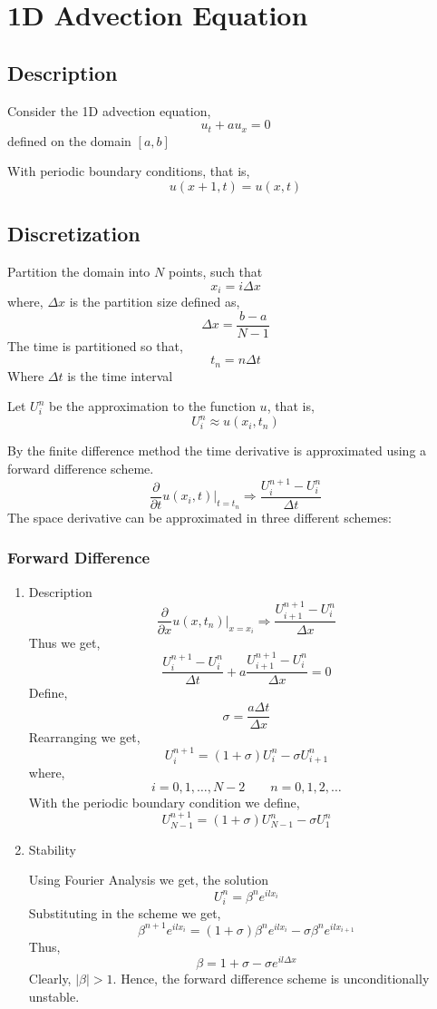 \documentclass[11pt]{article}
\date{\today}
\title{}
\begin{document}
\tableofcontents

\section{1D Advection Equation}
\label{sec:orgfada84c}
\subsection{Description}
\label{sec:orgc50bc7d}
Consider the 1D advection equation,
$$u_t + a u_x = 0$$
defined on the domain \([a,b]\)

With periodic boundary conditions, that is,
$$u(x+1,t) = u(x,t)$$
\subsection{Discretization}
\label{sec:orge79bf49}
Partition the domain into \(N\) points, such that
$$x_i = i \Delta x$$
where, \(\Delta x\) is the partition size defined as,
$$\Delta x = \frac{b - a}{N-1}$$
The time is partitioned so that,
$$t_n = n \Delta t$$
Where \(\Delta t\) is the time interval

Let \(U_i^n\) be the approximation to the function \(u\), that is,
$$U_i^n \approx u(x_i,t_n)$$

By the finite difference method the time derivative is approximated using a forward difference scheme.
$$\frac{\partial}{\partial t} u(x_i,t) \bigg|_{t=t_n} \Rightarrow \frac{U_i^{n+1} - U_i^n}{\Delta t}$$
The space derivative can be approximated in three different schemes:
\subsubsection{Forward Difference}
\label{sec:org03cc0ae}
\begin{enumerate}
\item Description
\label{sec:org9fb14fc}
$$\frac{\partial}{\partial x} u(x,t_n) \bigg|_{x=x_i} \Rightarrow \frac{U_{i+1}^{n+1} - U_i^n}{\Delta x}$$
Thus we get,
$$\frac{U_i^{n+1} - U_i^n}{\Delta t} + a \frac{U_{i+1}^{n+1} - U_i^n}{\Delta x} = 0$$
Define,
$$\sigma = \frac{a \Delta t}{\Delta x}$$
Rearranging we get,
$$U_i^{n+1} = \left( 1 + \sigma \right) U_i^n - \sigma U_{i+1}^n$$
where,
$$i=0,1,\ldots,N-2 \qquad n = 0,1,2,\ldots$$
With the periodic boundary condition we define,
$$U_{N-1}^{n+1} = \left( 1 + \sigma \right) U_{N-1}^n - \sigma U_{1}^n$$
\item Stability
\label{sec:org364e93e}

Using Fourier Analysis we get, the solution
$$U_i^n = \beta^n e^{i l x_i}$$
Substituting in the scheme we get,
$$\beta^{n+1} e^{i l x_i} = \left( 1 + \sigma \right) \beta^n e^{i l x_i} - \sigma \beta^n e^{i l x_{i+1}}$$
Thus,
$$\beta = 1 + \sigma - \sigma e^{i l \Delta x}$$
Clearly, \(\lvert \beta \rvert > 1\). Hence, the forward difference scheme is unconditionally unstable.
\end{enumerate}
\end{document}
